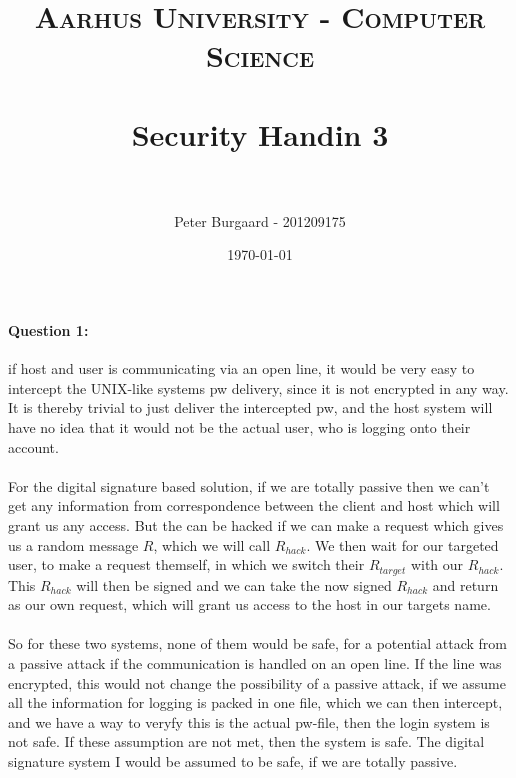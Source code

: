 \documentclass[paper=a4, fontsize=11pt]{scrartcl} %
\title{	
	\normalfont \normalsize 
	\textsc{Aarhus University - Computer Science} \\ [25pt] %
	\horrule{0.5pt} \\[0.4cm] %
	\huge Security Handin 3 \\ %
	\horrule{2pt} \\[0.5cm] %
}
\author{Peter Burgaard - 201209175} %
\date{\normalsize\today} %
\numberwithin{equation}{section} %
\numberwithin{figure}{section} %
\numberwithin{table}{section} %
\begin{document}
	
	\maketitle %
	
	\paragraph{Question 1:} if host and user is communicating via an open line, it would be very easy to intercept the UNIX-like systems pw delivery, since it is not encrypted in any way. It is thereby trivial to just deliver the intercepted pw, and the host system will have no idea that it would not be the actual user, who is logging onto their account. \\ \\
	For the digital signature based solution, if we are totally passive then we can't get any information from correspondence between the client and host which will grant us any access. But the can be hacked if we can make a request which gives us a random message $R$, which we will call $R_{hack}$. We then wait for our targeted user, to make a request themself, in which we switch their $R_{target}$ with our $R_{hack}$. This $R_{hack}$ will then be signed and we can take the now signed $R_{hack}$ and return as our own request, which will grant us access to the host in our targets name.  \\ \\ 
	So for these two systems, none of them would be safe, for a potential attack from a passive attack if the communication is handled on an open line. If the line was encrypted, this would not change the possibility of a passive attack, if we assume all the information for logging is packed in one file, which we can then intercept, and we have a way to veryfy this is the actual pw-file, then the login system is not safe. If these assumption are not met, then the system is safe. The digital signature system I would be assumed to be safe, if we are totally passive.
\end{document}
